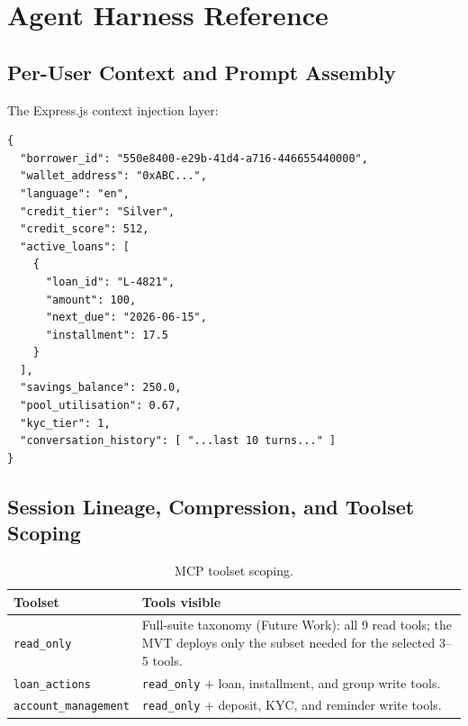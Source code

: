 \documentclass[12pt,a4paper]{report}
\newcommand{\tableheadcolor}{\rowcolor{TableHeadBg}}
\begin{document}
%
%
\chapter{Agent Harness Reference}
\label{app:agent-harness}

\section{Per-User Context and Prompt Assembly}

The Express.js context injection layer:

\begin{verbatim}
{
  "borrower_id": "550e8400-e29b-41d4-a716-446655440000",
  "wallet_address": "0xABC...",
  "language": "en",
  "credit_tier": "Silver",
  "credit_score": 512,
  "active_loans": [
    {
      "loan_id": "L-4821",
      "amount": 100,
      "next_due": "2026-06-15",
      "installment": 17.5
    }
  ],
  "savings_balance": 250.0,
  "pool_utilisation": 0.67,
  "kyc_tier": 1,
  "conversation_history": [ "...last 10 turns..." ]
}
\end{verbatim}

\section{Session Lineage, Compression, and Toolset Scoping}

\begin{table}[H]
\centering
\caption[MCP toolset scoping]{MCP toolset scoping.}
\label{tab:agent-toolsets}
\begin{tabular}{p{3.5cm}p{9cm}}
\toprule
\tableheadcolor
\textbf{Toolset} & \textbf{Tools visible} \\
\midrule
\texttt{read\_only} & Full-suite taxonomy (Future Work): all 9 read tools; the MVT deploys only the subset needed for the selected 3--5 tools. \\
\texttt{loan\_actions} & \texttt{read\_only} $+$ loan, installment, and group write tools. \\
\texttt{account\_management} & \texttt{read\_only} $+$ deposit, KYC, and reminder write tools. \\
\bottomrule
\end{tabular}
\end{table}
\end{document}
